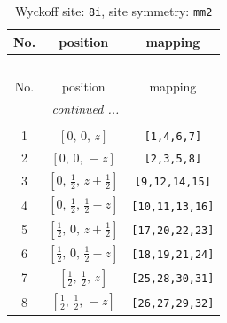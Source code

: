 \documentclass[fleqn,8pt]{jsarticle}
\begin{document}
\begin{longtable}{ccc}
\caption{Wyckoff site: {\tt 8i}, site symmetry: {\tt mm2}}
 \\
 \hline \hline
No. & position & mapping \\ \hline \endfirsthead

\multicolumn{2}{l}{\tablename\ \thetable{}} \\
 \hline \hline
No. & position & mapping \\ \hline \endhead

 \hline \hline
\multicolumn{2}{r}{\footnotesize\it continued ...} \\ \endfoot

 \hline \hline
\multicolumn{2}{r}{} \\ \endlastfoot

1 & $\left[ 0,\, 0,\, z \right]$ & {\tt [1,4,6,7]} \\ \hline
2 & $\left[ 0,\, 0,\, - z \right]$ & {\tt [2,3,5,8]} \\ \hline
3 & $\left[ 0,\, \frac{1}{2},\, z + \frac{1}{2} \right]$ & {\tt [9,12,14,15]} \\ \hline
4 & $\left[ 0,\, \frac{1}{2},\, \frac{1}{2} - z \right]$ & {\tt [10,11,13,16]} \\ \hline
5 & $\left[ \frac{1}{2},\, 0,\, z + \frac{1}{2} \right]$ & {\tt [17,20,22,23]} \\ \hline
6 & $\left[ \frac{1}{2},\, 0,\, \frac{1}{2} - z \right]$ & {\tt [18,19,21,24]} \\ \hline
7 & $\left[ \frac{1}{2},\, \frac{1}{2},\, z \right]$ & {\tt [25,28,30,31]} \\ \hline
8 & $\left[ \frac{1}{2},\, \frac{1}{2},\, - z \right]$ & {\tt [26,27,29,32]} \\
\end{longtable}
\renewcommand{\arraystretch}{1.2}
\end{document}
